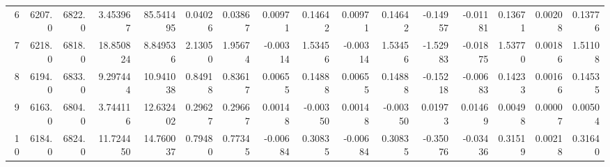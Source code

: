 \begin{longtable}{rrrrrrrrrrrrrrrr}
           6 &          6207.0 &          6822.0 &            3.453967 &             85.541495 &                    0.04026 &                           0.03867 &                                         0.00971 &                                            0.14642 &                                        0.00971 &                                            0.14642 &                                          -0.14957 &                                           -0.01181 &                 0.13671 &                0.00208 &                   0.13776 \\
           7 &          6218.0 &          6818.0 &           18.850824 &              8.849536 &                    2.13050 &                           1.95674 &                                        -0.00314 &                                            1.53456 &                                       -0.00314 &                                            1.53456 &                                          -1.52983 &                                           -0.01875 &                 1.53770 &                0.00186 &                   1.51108 \\
           8 &          6194.0 &          6833.0 &            9.297444 &             10.941038 &                    0.84918 &                           0.83617 &                                         0.00655 &                                            0.14888 &                                        0.00655 &                                            0.14888 &                                          -0.15218 &                                           -0.00683 &                 0.14233 &                0.00166 &                   0.14535 \\
           9 &          6163.0 &          6804.0 &            3.744116 &             12.632402 &                    0.29627 &                           0.29667 &                                         0.00148 &                                           -0.00350 &                                        0.00148 &                                           -0.00350 &                                           0.01973 &                                            0.01469 &                 0.00498 &                0.00007 &                   0.00504 \\
          10 &          6184.0 &          6824.0 &           11.724450 &             14.760037 &                    0.79480 &                           0.77345 &                                        -0.00684 &                                            0.30835 &                                       -0.00684 &                                            0.30835 &                                          -0.35076 &                                           -0.03436 &                 0.31519 &                0.00218 &                   0.31640 \\
\end{longtable}
